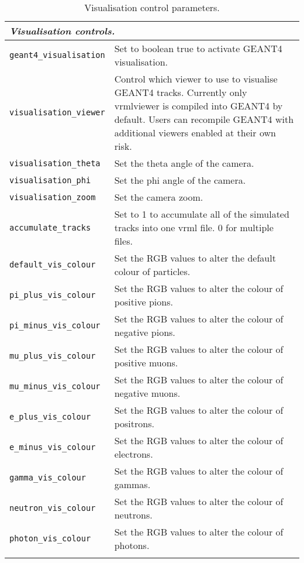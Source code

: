 \begin{table*}
\begin{center}
\caption{Visualisation control parameters.}
\begin{tabularx}{\textwidth}{lX}
\hline
\multicolumn{2}{l}{\emph{Visualisation controls.}} \\
\hline
\verb|geant4_visualisation| & Set to boolean true to activate GEANT4 visualisation.\\
\verb|visualisation_viewer| & Control which viewer to use to visualise GEANT4 tracks. Currently only vrmlviewer is compiled into GEANT4 by default. Users can recompile GEANT4 with additional viewers enabled at their own risk.\\
\verb|visualisation_theta| & Set the theta angle of the camera.\\
\verb|visualisation_phi| & Set the phi angle of the camera.\\
\verb|visualisation_zoom| & Set the camera zoom.\\
\verb|accumulate_tracks| & Set to 1 to accumulate all of the simulated tracks into one vrml file. 0 for multiple files.\\
\verb|default_vis_colour| & Set the RGB values to alter the default colour of particles.\\
\verb|pi_plus_vis_colour| & Set the RGB values to alter the colour of positive pions.\\
\verb|pi_minus_vis_colour| & Set the RGB values to alter the colour of negative pions.\\
\verb|mu_plus_vis_colour| & Set the RGB values to alter the colour of positive muons.\\
\verb|mu_minus_vis_colour| & Set the RGB values to alter the colour of negative muons.\\
\verb|e_plus_vis_colour| & Set the RGB values to alter the colour of positrons.\\
\verb|e_minus_vis_colour| & Set the RGB values to alter the colour of electrons.\\
\verb|gamma_vis_colour| & Set the RGB values to alter the colour of gammas.\\
\verb|neutron_vis_colour| & Set the RGB values to alter the colour of neutrons.\\
\verb|photon_vis_colour| & Set the RGB values to alter the colour of photons.\\
\begin{makeimage} %
\end{makeimage} 
\end{tabularx}
\end{center}
\end{table*}
